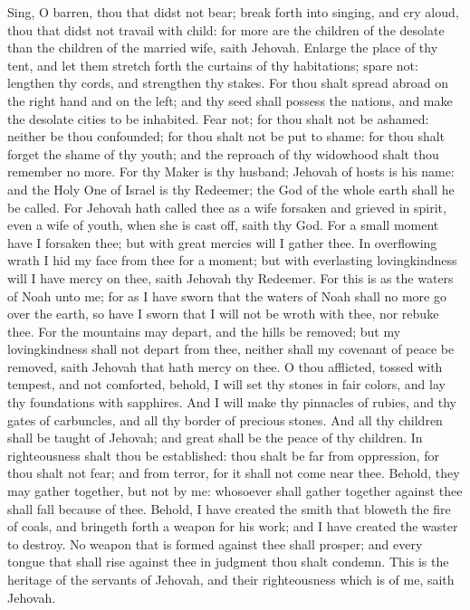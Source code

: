 Sing, O barren, thou that didst not bear; break forth into singing, and cry aloud, thou that didst not travail with child: for more are the children of the desolate than the children of the married wife, saith Jehovah. Enlarge the place of thy tent, and let them stretch forth the curtains of thy habitations; spare not: lengthen thy cords, and strengthen thy stakes. For thou shalt spread abroad on the right hand and on the left; and thy seed shall possess the nations, and make the desolate cities to be inhabited.  Fear not; for thou shalt not be ashamed: neither be thou confounded; for thou shalt not be put to shame: for thou shalt forget the shame of thy youth; and the reproach of thy widowhood shalt thou remember no more. For thy Maker is thy husband; Jehovah of hosts is his name: and the Holy One of Israel is thy Redeemer; the God of the whole earth shall he be called. For Jehovah hath called thee as a wife forsaken and grieved in spirit, even a wife of youth, when she is cast off, saith thy God. For a small moment have I forsaken thee; but with great mercies will I gather thee. In overflowing wrath I hid my face from thee for a moment; but with everlasting lovingkindness will I have mercy on thee, saith Jehovah thy Redeemer.  For this is as the waters of Noah unto me; for as I have sworn that the waters of Noah shall no more go over the earth, so have I sworn that I will not be wroth with thee, nor rebuke thee. For the mountains may depart, and the hills be removed; but my lovingkindness shall not depart from thee, neither shall my covenant of peace be removed, saith Jehovah that hath mercy on thee.  O thou afflicted, tossed with tempest, and not comforted, behold, I will set thy stones in fair colors, and lay thy foundations with sapphires. And I will make thy pinnacles of rubies, and thy gates of carbuncles, and all thy border of precious stones. And all thy children shall be taught of Jehovah; and great shall be the peace of thy children. In righteousness shalt thou be established: thou shalt be far from oppression, for thou shalt not fear; and from terror, for it shall not come near thee. Behold, they may gather together, but not by me: whosoever shall gather together against thee shall fall because of thee. Behold, I have created the smith that bloweth the fire of coals, and bringeth forth a weapon for his work; and I have created the waster to destroy. No weapon that is formed against thee shall prosper; and every tongue that shall rise against thee in judgment thou shalt condemn. This is the heritage of the servants of Jehovah, and their righteousness which is of me, saith Jehovah. 

